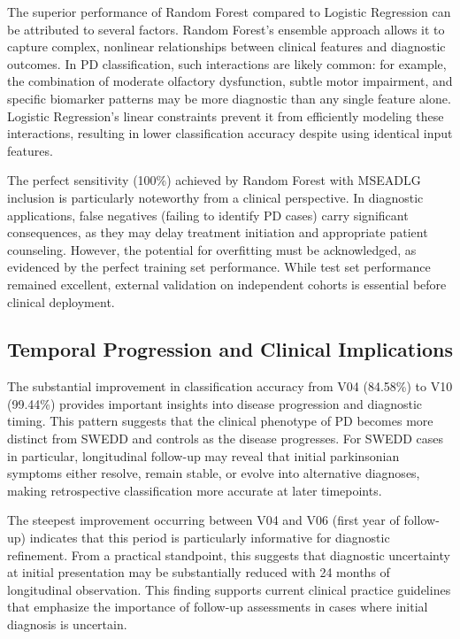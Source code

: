 \documentclass[12pt,a4paper]{article}
\begin{document}
The superior performance of Random Forest compared to Logistic Regression can be attributed to several factors. Random Forest's ensemble approach allows it to capture complex, nonlinear relationships between clinical features and diagnostic outcomes. In PD classification, such interactions are likely common: for example, the combination of moderate olfactory dysfunction, subtle motor impairment, and specific biomarker patterns may be more diagnostic than any single feature alone. Logistic Regression's linear constraints prevent it from efficiently modeling these interactions, resulting in lower classification accuracy despite using identical input features.

The perfect sensitivity (100\%) achieved by Random Forest with MSEADLG inclusion is particularly noteworthy from a clinical perspective. In diagnostic applications, false negatives (failing to identify PD cases) carry significant consequences, as they may delay treatment initiation and appropriate patient counseling. However, the potential for overfitting must be acknowledged, as evidenced by the perfect training set performance. While test set performance remained excellent, external validation on independent cohorts is essential before clinical deployment.

\subsection*{Temporal Progression and Clinical Implications}

The substantial improvement in classification accuracy from V04 (84.58\%) to V10 (99.44\%) provides important insights into disease progression and diagnostic timing. This pattern suggests that the clinical phenotype of PD becomes more distinct from SWEDD and controls as the disease progresses. For SWEDD cases in particular, longitudinal follow-up may reveal that initial parkinsonian symptoms either resolve, remain stable, or evolve into alternative diagnoses, making retrospective classification more accurate at later timepoints.

The steepest improvement occurring between V04 and V06 (first year of follow-up) indicates that this period is particularly informative for diagnostic refinement. From a practical standpoint, this suggests that diagnostic uncertainty at initial presentation may be substantially reduced with 24 months of longitudinal observation. This finding supports current clinical practice guidelines that emphasize the importance of follow-up assessments in cases where initial diagnosis is uncertain.
\end{document}
